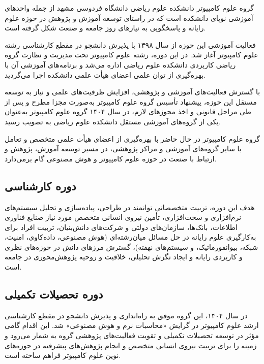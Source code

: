 \documentclass[
  letterpaper,
  DIV=11,
  numbers=noendperiod]{scrreprt}
\begin{document}
گروه علوم کامپیوتر دانشکده علوم ریاضی دانشگاه فردوسی مشهد از جمله
واحدهای آموزشی نوپای دانشکده است که در راستای توسعه آموزش و پژوهش در
حوزه علوم رایانه و پاسخگویی به نیازهای روز جامعه و صنعت شکل گرفته است.

فعالیت آموزشی این حوزه از سال ۱۳۹۸ با پذیرش دانشجو در مقطع کارشناسی رشته
علوم کامپیوتر آغاز شد. در این دوره، رشته علوم کامپیوتر تحت مدیریت و
نظارت گروه ریاضی کاربردی دانشکده علوم ریاضی اداره می‌شد و برنامه‌های
آموزشی آن با بهره‌گیری از توان علمی اعضای هیأت علمی دانشکده اجرا می‌گردید.

با گسترش فعالیت‌های آموزشی و پژوهشی، افزایش ظرفیت‌های علمی و نیاز به توسعه
مستقل این حوزه، پیشنهاد تأسیس گروه علوم کامپیوتر به‌صورت مجزا مطرح و پس
از طی مراحل قانونی و اخذ مجوزهای لازم، در سال ۱۴۰۴ گروه علوم کامپیوتر
به‌عنوان یکی از گروه‌های آموزشی مستقل دانشکده علوم ریاضی به تصویب رسید.

گروه علوم کامپیوتر در حال حاضر با بهره‌گیری از اعضای هیأت علمی متخصص و
تعامل با سایر گروه‌های آموزشی و مراکز پژوهشی، در مسیر توسعه آموزش، پژوهش
و ارتباط با صنعت در حوزه علوم کامپیوتر و هوش مصنوعی گام برمی‌دارد.

\subsection{دوره
کارشناسی}\label{ux62fux648ux631ux647-ux6a9ux627ux631ux634ux646ux627ux633ux6cc-3}

هدف این دوره، تربیت متخصصانی توانمند در طراحی، پیاده‌سازی و تحلیل
سیستم‌های نرم‌افزاری و سخت‌افزاری، تأمین نیروی انسانی متخصص مورد نیاز صنایع
فناوری اطلاعات، بانک‌ها، سازمان‌های دولتی و شرکت‌های دانش‌بنیان، تربیت افراد
برای به‌کارگیری علوم رایانه در حل مسائل میان‌رشته‌ای (هوش مصنوعی، داده‌کاوی،
امنیت، شبکه، بیوانفورماتیک، و سیستم‌های نهفته)، گسترش مرزهای دانش در
حوزه‌های نظری و کاربردی رایانه و ایجاد نگرش تحلیلی، خلاقیت و روحیه‌
پژوهش‌محوری در جامعه است.

\subsection{دوره تحصیلات
تکمیلی}\label{ux62fux648ux631ux647-ux62aux62dux635ux6ccux644ux627ux62a-ux62aux6a9ux645ux6ccux644ux6cc-3}

در سال ۱۴۰۴، این گروه موفق به راه‌اندازی و پذیرش دانشجو در مقطع کارشناسی
ارشد علوم کامپیوتر در گرایش «محاسبات نرم و هوش مصنوعی» شد. این اقدام
گامی مؤثر در توسعه تحصیلات تکمیلی و تقویت فعالیت‌های پژوهشی گروه به شمار
می‌رود و زمینه را برای تربیت نیروی انسانی متخصص و انجام پژوهش‌های پیشرفته
در حوزه‌های نوین علوم کامپیوتر فراهم ساخته است.
\end{document}
